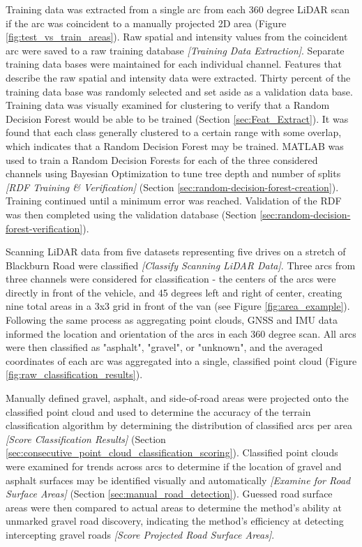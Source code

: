 \documentclass[numbered,pdftex]{ohio-etd}
\begin{document}
{		{Training data was extracted from a single arc from each 360 degree LiDAR scan if the arc was coincident to a manually projected 2D area (Figure \ref{fig:test_vs_train_areas}). Raw spatial and intensity values from the coincident arc were saved to a raw training database \textit{[Training Data Extraction]}. Separate training data bases were maintained for each individual channel. Features that describe the raw spatial and intensity data were extracted. Thirty percent of the training data base was randomly selected and set aside as a validation data base. Training data was visually examined for clustering to verify that a Random Decision Forest would be able to be trained (Section \ref{sec:Feat_Extract}). It was found that each class generally clustered to a certain range with some overlap, which indicates that a Random Decision Forest may be trained. MATLAB was used to train a Random Decision Forests for each of the three considered channels using Bayesian Optimization to tune tree depth and number of splits \textit{[RDF Training \& Verification]} (Section \ref{sec:random-decision-forest-creation}). Training continued until a minimum error was reached. Validation of the RDF was then completed using the validation database (Section \ref{sec:random-decision-forest-verification}).}
		
		{Scanning LiDAR data from five datasets representing five drives on a stretch of Blackburn Road were classified \textit{[Classify Scanning LiDAR Data]}. Three arcs from three channels were considered for classification - the centers of the arcs were directly in front of the vehicle, and 45 degrees left and right of center, creating nine total areas in a 3x3 grid in front of the van (see Figure \ref{fig:area_example}). Following the same process as aggregating point clouds, GNSS and IMU data informed the location and orientation of the arcs in each 360 degree scan. All arcs were then classified as "asphalt", "gravel", or "unknown", and the averaged coordinates of each arc was aggregated into a single, classified point cloud (Figure \ref{fig:raw_classification_results}).}
		
		{Manually defined gravel, asphalt, and side-of-road areas were projected onto the classified point cloud and used to determine the accuracy of the terrain classification algorithm by determining the distribution of classified arcs per area \textit{[Score Classification Results]} (Section \ref{sec:consecutive_point_cloud_classification_scoring}). Classified point clouds were examined for trends across arcs to determine if the location of gravel and asphalt surfaces may be identified visually and automatically \textit{[Examine for Road Surface Areas]} (Section \ref{sec:manual_road_detection}). Guessed road surface areas were then compared to actual areas to determine the method's ability at unmarked gravel road discovery, indicating the method's efficiency at detecting intercepting gravel roads \textit{[Score Projected Road Surface Areas]}.}

}
\end{document}
